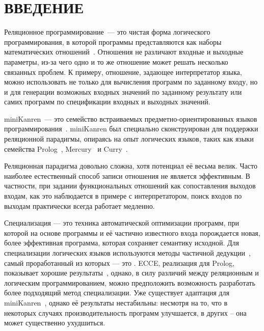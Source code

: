 \section*{ВВЕДЕНИЕ}


Реляционное программирование~--- это чистая форма логического программирования,
в которой программы представляются как наборы математических отношений~\cite{byrdMK}.
Отношения
не различают входные и выходные параметры, из-за чего одно и то же
отношение может решать несколько связанных проблем. К примеру, отношение, задающее
интерпретатор языка, можно использовать не только для вычисления программ по
заданному входу, но и для генерации возможных входных значений по заданному результату
или самих программ по спецификации входных и выходных значений.

miniKanren~--- это семейство встраиваемых предметно-ориентированных языков программирования~\cite{byrdMK}.
miniKanren был специально сконструирован для поддержки реляционной парадигмы,
опираясь на опыт логических языков, таких как языки семейства Prolog~\cite{logicMJ},
Mercury~\cite{mercury} и Curry~\cite{curry}.

Реляционная парадигма довольно сложна, хотя потенциал её весьма велик.
Часто наиболее естественный способ записи отношения не является эффективным. В
частности, при задании функциональных отношений как сопоставления выходов
входам, как это наблюдается в примере с интерпретатором, поиск входов по выходам практически
всегда работает медленно.

Специализация --- это техника автоматической оптимизации программ,
при которой на основе программы и её частично известного входа
порождается новая, более эффективная программа, которая сохраняет семантику
исходной. Для специализации логических языков используются методы частичной дедукции~\cite{advanced},
самый проработанный из которых --- это \cpd\cite{cpd}. ECCE, реализация \forcpd для Prolog, показывает
хорошие результаты~\cite{controlPoly},
однако, в силу различий между реляционным и логическим программированием, можно предположить возможность разработать более подходящий
метод специализации. Уже существует адаптация \forcpd для miniKanren~\cite{lozov},
однако её результаты нестабильны: несмотря на то, что в некоторых случаях
производительность программ улучшается, в других -- она может существенно ухудшиться.

